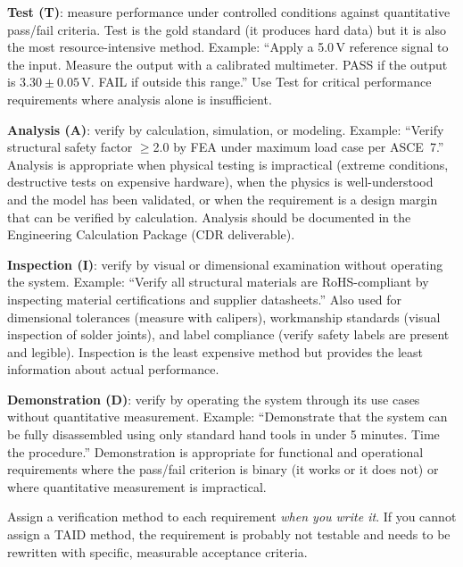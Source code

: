 \textbf{Test (T)}: measure performance under controlled conditions against quantitative pass/fail criteria. Test is the gold standard (it produces hard data) but it is also the most resource-intensive method. Example: ``Apply a 5.0\,V reference signal to the input. Measure the output with a calibrated multimeter. PASS if the output is $3.30 \pm 0.05$\,V. FAIL if outside this range.'' Use Test for critical performance requirements where analysis alone is insufficient.

\textbf{Analysis (A)}: verify by calculation, simulation, or modeling. Example: ``Verify structural safety factor $\geq$2.0 by FEA under maximum load case per ASCE~7.'' Analysis is appropriate when physical testing is impractical (extreme conditions, destructive tests on expensive hardware), when the physics is well-understood and the model has been validated, or when the requirement is a design margin that can be verified by calculation. Analysis should be documented in the Engineering Calculation Package (CDR deliverable).

\textbf{Inspection (I)}: verify by visual or dimensional examination without operating the system. Example: ``Verify all structural materials are RoHS-compliant by inspecting material certifications and supplier datasheets.'' Also used for dimensional tolerances (measure with calipers), workmanship standards (visual inspection of solder joints), and label compliance (verify safety labels are present and legible). Inspection is the least expensive method but provides the least information about actual performance.

\textbf{Demonstration (D)}: verify by operating the system through its use cases without quantitative measurement. Example: ``Demonstrate that the system can be fully disassembled using only standard hand tools in under 5 minutes. Time the procedure.'' Demonstration is appropriate for functional and operational requirements where the pass/fail criterion is binary (it works or it does not) or where quantitative measurement is impractical.

Assign a verification method to each requirement \emph{when you write it}. If you cannot assign a TAID method, the requirement is probably not testable and needs to be rewritten with specific, measurable acceptance criteria.

